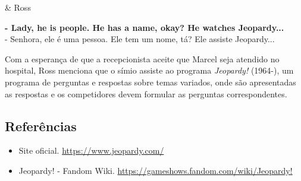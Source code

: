 \begin{tcolorbox}[enhanced,center upper,
    drop fuzzy shadow southeast, boxrule=0.3pt,
    lower separated=false,
    colframe=black!30!dialogoBorder,colback=white]
\begin{minipage}[c]{0.16\linewidth}
   & \centering \scriptsize{Ross}
\end{minipage}
\hfill
\begin{minipage}[c]{0.8\linewidth}
  \textbf{- Lady, he is people. He has a name, okay? He watches Jeopardy...}\\
  - Senhora, ele é uma pessoa. Ele tem um nome, tá? Ele assiste Jeopardy...
\end{minipage}
\end{tcolorbox}

Com a esperança de que a recepcionista aceite que Marcel seja atendido
no hospital, Ross menciona que o símio assiste ao programa
\emph{Jeopardy!} (1964-), um programa de perguntas e respostas sobre
temas variados, onde são apresentadas as respostas e os competidores
devem formular as perguntas correspondentes.

\hypertarget{referuxeancias-5}{%
\subsection{Referências}\label{referuxeancias-5}}

\begin{itemize}
\tightlist
\item
  \sloppy Site oficial. \url{https://www.jeopardy.com/}
\item
  \sloppy Jeopardy! - Fandom Wiki. \url{https://gameshows.fandom.com/wiki/Jeopardy!}
\end{itemize}
